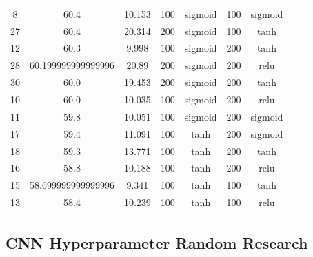 \begin{table}[h]
\begin{tabular}{@{}ccccccc@{}}
8  & 60.4               & 10.153      & 100     & sigmoid      & 100     & sigmoid      \\
27 & 60.4               & 20.314      & 200     & sigmoid      & 100     & tanh         \\
12 & 60.3               & 9.998       & 100     & sigmoid      & 200     & tanh         \\
28 & 60.199999999999996 & 20.89       & 200     & sigmoid      & 200     & relu         \\
30 & 60.0               & 19.453      & 200     & sigmoid      & 200     & tanh         \\
10 & 60.0               & 10.035      & 100     & sigmoid      & 200     & relu         \\
11 & 59.8               & 10.051      & 100     & sigmoid      & 200     & sigmoid      \\
17 & 59.4               & 11.091      & 100     & tanh         & 200     & sigmoid      \\
18 & 59.3               & 13.771      & 100     & tanh         & 200     & tanh         \\
16 & 58.8               & 10.188      & 100     & tanh         & 200     & relu         \\
15 & 58.699999999999996 & 9.341       & 100     & tanh         & 100     & tanh         \\
13 & 58.4               & 10.239      & 100     & tanh         & 100     & relu         \\ \bottomrule
\end{tabular}
\end{table}

\newpage

\subsection*{CNN Hyperparameter Random Research}

